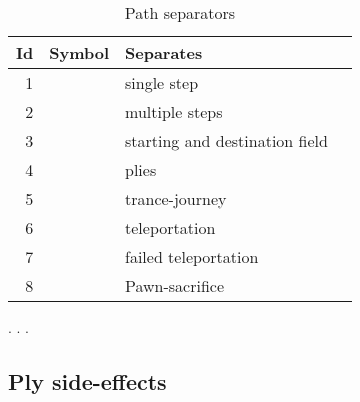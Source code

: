 \begin{table}[!h]
\centering
\begin{tabular}{ rlll }
\toprule
\textbf{Id} & \textbf{Symbol}      & \textbf{Separates}             \\
\midrule
1           & \alg{.}              & single step                    \\
2           & \alg{..}             & multiple steps                 \\
3           & \alg{-}              & starting and destination field \\
4           & \alg{\~{}}           & plies                          \\
5           & \alg{@}              & trance-journey                 \\
6           & \alg{|}              & teleportation                  \\
7           & \alg{||}             & failed teleportation           \\
8           & \alg{::}             & Pawn-sacrifice                 \\
\bottomrule
\end{tabular}
\caption{Path separators}
\label{tbl:Appendix/Path separators}
\end{table}

. . .

\clearpage %

\subsection*{Ply side-effects}
\label{sec:Appendix/Ply side-effects}

